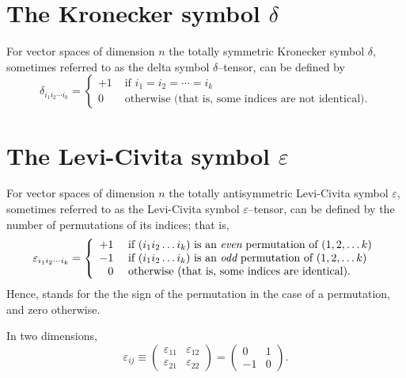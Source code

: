\section{The Kronecker symbol $\delta$}
For vector spaces of dimension $n$ the totally symmetric Kronecker symbol $\delta$,
sometimes referred to
as the delta symbol $\delta$--tensor, can be defined by
\begin{equation}
\delta_{i_1 i_2\cdots i_k}
=
\left\{
\begin{array}{rl}
+1&\textrm{ if }  i_1 = i_2 = \cdots = i_k \\
0&\textrm{ otherwise (that is, some indices are not identical).}
\end{array}
\right.
\end{equation}

\section{The Levi-Civita symbol $\varepsilon$}
For vector spaces of dimension $n$ the totally antisymmetric Levi-Civita symbol $\varepsilon$, sometimes referred to
as the Levi-Civita symbol $\varepsilon$--tensor, can be defined by the number of permutations of its indices; that is,
\begin{equation}
\varepsilon_{i_1 i_2\cdots i_k}
=
\left\{
\begin{array}{rl}
+1&\textrm{ if } (i_1 i_2\ldots i_k) \textrm{ is an {\em even} permutation of } (1,2,\ldots k)\\
-1&\textrm{ if } (i_1 i_2\ldots i_k) \textrm{ is an {\em odd} permutation of } (1,2,\ldots k)\\
0&\textrm{ otherwise (that is, some indices are identical).}
\end{array}
\right.
\end{equation}
Hence, stands for the  the sign of the permutation in the case of a permutation, and zero otherwise.

{
\color{blue}
\bexample

In two dimensions,
$$\varepsilon_{ij}\equiv
\left(
\begin{array}{rrrr}
\varepsilon_{11}&\varepsilon_{12}\\
\varepsilon_{21}&\varepsilon_{22}
\end{array}
\right)
=
\left(
\begin{array}{rrrr}
0&1\\
-1&0
\end{array}
\right)
.
$$
\eexample
}

